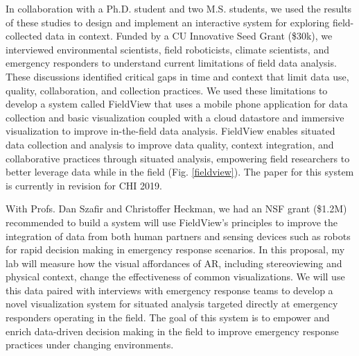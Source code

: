 \documentclass[11pt]{article}
\begin{document}
In collaboration with a Ph.D. student and two M.S. students, we used the results of these studies to design and implement an interactive system for exploring field-collected data in context. Funded by a CU Innovative Seed Grant (\$30k), we interviewed environmental scientists, field roboticists, climate scientists, and emergency responders to understand current limitations of field data analysis. These discussions identified critical gaps in time and context that limit data use, quality, collaboration, and collection practices. We used these limitations to develop a system called FieldView that uses a mobile phone application for data collection and basic visualization coupled with a cloud datastore and immersive visualization to improve in-the-field data analysis. 
FieldView enables situated data collection and analysis to improve data quality, context integration, and collaborative practices through situated analysis, empowering field researchers to better leverage data while in the field (Fig. \ref{fieldview}). The paper for this system is currently in revision for CHI 2019. 

With Profs. Dan Szafir and Christoffer Heckman, we had an NSF grant (\$1.2M) recommended to build a system will use FieldView's principles to improve the integration of data from both human partners and sensing devices such as robots for rapid decision making in emergency response scenarios. In this proposal, my lab will measure how the visual affordances of AR, including stereoviewing and physical context, change the effectiveness of common visualizations. We will use this data paired with interviews with emergency response teams to develop a novel visualization system for situated analysis targeted directly at emergency responders operating in the field. The goal of this system is to empower and enrich data-driven decision making in the field to improve emergency response practices under changing environments. 

\end{document}
